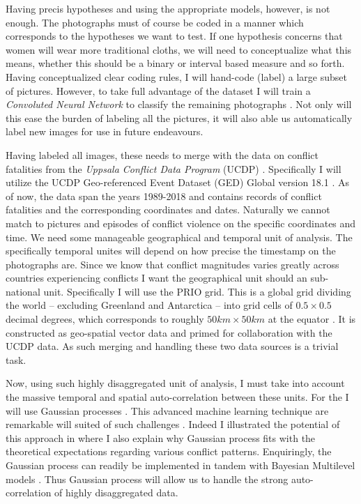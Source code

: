 \documentclass[a4paper]{article}
\begin{document}
Having precis hypotheses and using the appropriate models, however, is not enough. The photographs must of course be coded in a manner which corresponds to the hypotheses we want to test. If one hypothesis concerns that women will wear more traditional cloths, we will need to conceptualize what this means, whether this should be a binary or interval based measure and so forth. Having conceptualized clear coding rules, I will hand-code (label) a large subset of pictures. However, to take full advantage of the dataset I will train a \emph{Convoluted Neural Network} to classify the remaining photographs \citep[XX]{francois2017deep}. Not only will this ease the burden of labeling all the pictures, it will also able us automatically label new images for use in future endeavours.\par    
Having labeled all images, these needs to merge with the data on conflict fatalities from  the \emph{Uppsala Conflict Data Program} (UCDP) \citep{Sundberg_2013, Croicu_Sundberg_2017}. Specifically I will utilize the UCDP Geo-referenced Event Dataset (GED) Global version 18.1 \citep{UCDP_2017}. As of now, the data span the years 1989-2018 and contains records of conflict fatalities and the corresponding coordinates and dates. Naturally we cannot match to pictures and episodes of conflict violence on the specific coordinates and time. We need some manageable geographical and temporal unit of analysis. The specifically temporal unites will depend on how precise the timestamp on the photographs are. Since we know that conflict magnitudes varies greatly across countries experiencing conflicts I want the geographical unit should an sub-national unit. Specifically I will use the PRIO grid. This is a global grid dividing the world -- excluding Greenland and Antarctica -- into grid cells of $0.5 \times 0.5$ decimal degrees, which corresponds to roughly $50km\times50km$ at the equator \citep[367]{Tollefsen_2012}. It is constructed as geo-spatial vector data and primed for collaboration with the UCDP data. As such merging and handling these two data sources is a trivial task.\par

Now, using such highly disaggregated unit of analysis, I must take into account the massive temporal and spatial auto-correlation between these units. For the I will use Gaussian processes \cite{williams2006gaussian}. This advanced machine learning technique are remarkable will suited of  such challenges \citep{Gelman_2013, gelfand2016spatial, Mcelreath_2018, SPECIALE}. Indeed I illustrated the potential of this approach in \cite{SPECIALE} where I also explain why Gaussian process fits with the theoretical expectations regarding various conflict patterns\citep[XXX]{SPECIALE}. Enquiringly, the Gaussian process can readily be implemented in tandem with Bayesian Multilevel models \citep[XXX]{Mcelreath_2018}. Thus Gaussian process will allow us to handle the strong auto-correlation of highly disaggregated data.\par
\end{document}
